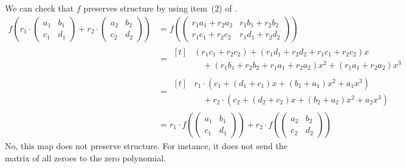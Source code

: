 \begin{exercises}
\begin{answer}
\begin{exparts}
        We can check that $f$ preserves structure by using 
        item~(2) of .
        \begin{align*}
          f(r_1\cdot\begin{pmatrix}
              a_1  &b_1  \\
              c_1  &d_1
            \end{pmatrix}
            +r_2\cdot\begin{pmatrix}
              a_2  &b_2  \\
              c_2  &d_2
            \end{pmatrix})
           &=
           f(\begin{pmatrix}
               r_1a_1+r_2a_2  &r_1b_1+r_2b_2  \\
               r_1c_1+r_2c_2  &r_1d_1+r_2d_2
             \end{pmatrix})                         \\
           &=\begin{aligned}[t]
               &(r_1c_1+r_2c_2)
               +(r_1d_1+r_2d_2+r_1c_1+r_2c_2)x                 \\
               &\mbox{}\quad +(r_1b_1+r_2b_2+r_1a_1+r_2a_2)x^2
                 +(r_1a_1+r_2a_2)x^3
             \end{aligned}                   \\
           &=\begin{aligned}[t]
                &r_1\cdot\left(c_1+(d_1+c_1)x+(b_1+a_1)x^2+a_1x^3\right) \\
                &\mbox{}\quad +r_2\cdot\left(c_2+(d_2+c_2)x
                            +(b_2+a_2)x^2+a_2x^3\right)
              \end{aligned} \\
           &=r_1\cdot f(\begin{pmatrix}
              a_1  &b_1  \\
              c_1  &d_1
            \end{pmatrix})
            +r_2\cdot f(\begin{pmatrix}
              a_2  &b_2  \\
              c_2  &d_2
            \end{pmatrix})
        \end{align*}
      \partsitem No, this map does not preserve structure.
        For instance, it does not send the matrix of all zeroes
        to the zero polynomial.
    \end{exparts}  

\end{answer}
\end{exercises}
